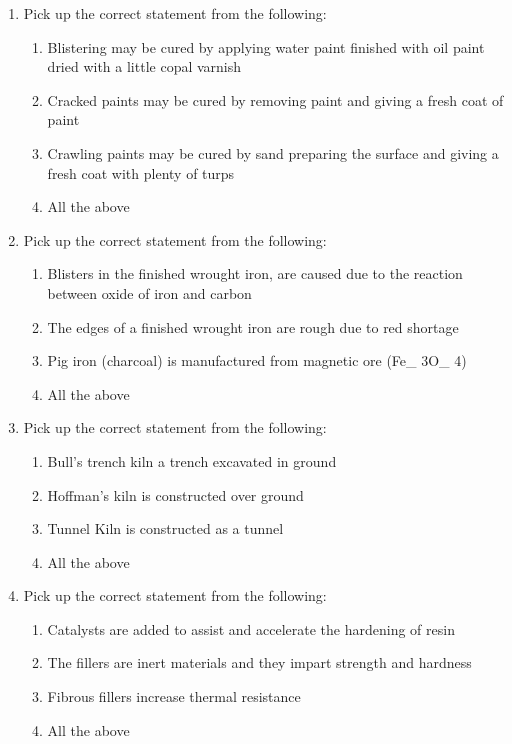 \documentclass[11pt,a4paper]{article}
\begin{document}
\begin{enumerate}
\item{Pick up the correct statement from the following:}
\begin{enumerate}[label=\Alph*.]
\item{Blistering may be cured by applying water paint finished with oil paint dried with a little copal varnish}
\item{Cracked paints may be cured by removing paint and giving a fresh coat of paint}
\item{Crawling paints may be cured by sand preparing the surface and giving a fresh coat with plenty of turps}
\item{All the above}
\end{enumerate}
\item{Pick up the correct statement from the following:}
\begin{enumerate}[label=\Alph*.]
\item{Blisters in the finished wrought iron, are caused due to the reaction between oxide of iron and carbon}
\item{The edges of a finished wrought iron are rough due to red shortage}
\item{Pig iron (charcoal) is manufactured from magnetic ore (Fe\_ 3O\_ 4)}
\item{All the above}
\end{enumerate}
\item{Pick up the correct statement from the following:}
\begin{enumerate}[label=\Alph*.]
\item{Bull's trench kiln a trench excavated in ground}
\item{Hoffman's kiln is constructed over ground}
\item{Tunnel Kiln is constructed as a tunnel}
\item{All the above}
\end{enumerate}
\item{Pick up the correct statement from the following:}
\begin{enumerate}[label=\Alph*.]
\item{Catalysts are added to assist and accelerate the hardening of resin}
\item{The fillers are inert materials and they impart strength and hardness}
\item{Fibrous fillers increase thermal resistance}
\item{All the above}

\end{enumerate}
\end{enumerate}
\end{document}
